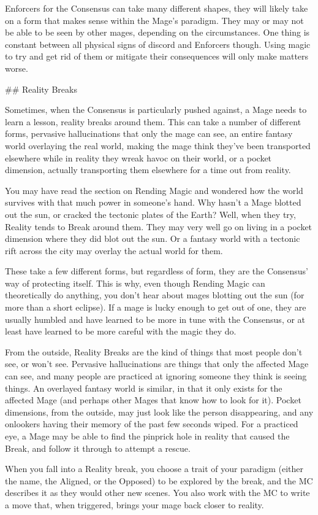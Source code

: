 \documentclass[
  oneside,
  statementpaper,
  9pt]{memoir}
\begin{document}
\begin{Player}
Enforcers for the Consensus can take many different shapes, they will likely take on a form that makes sense within the Mage’s paradigm. They may or may not be able to be seen by other mages, depending on the circumstances. One thing is constant between all physical signs of discord and Enforcers though. Using magic to try and get rid of them or mitigate their consequences will only make matters worse.

## Reality Breaks

Sometimes, when the Consensus is particularly pushed against, a Mage needs to learn a lesson, reality breaks around them. This can take a number of different forms, pervasive hallucinations that only the mage can see, an entire fantasy world overlaying the real world, making the mage think they’ve been transported elsewhere while in reality they wreak havoc on their world, or a pocket dimension, actually transporting them elsewhere for a time out from reality.

You may have read the section on Rending Magic and wondered how the world survives with that much power in someone’s hand. Why hasn’t a Mage blotted out the sun, or cracked the tectonic plates of the Earth? Well, when they try, Reality tends to Break around them. They may very well go on living in a pocket dimension where they did blot out the sun. Or a fantasy world with a tectonic rift across the city may overlay the actual world for them.

These take a few different forms, but regardless of form, they are the Consensus’ way of protecting itself. This is why, even though Rending Magic can theoretically do anything, you don’t hear about mages blotting out the sun (for more than a short eclipse). If a mage is lucky enough to get out of one, they are usually humbled and have learned to be more in tune with the Consensus, or at least have learned to be more careful with the magic they do.

From the outside, Reality Breaks are the kind of things that most people don’t see, or won’t see. Pervasive hallucinations are things that only the affected Mage can see, and many people are practiced at ignoring someone they think is seeing things. An overlayed fantasy world is similar, in that it only exists for the affected Mage (and perhaps other Mages that know how to look for it). Pocket dimensions, from the outside, may just look like the person disappearing, and any onlookers having their memory of the past few seconds wiped. For a practiced eye, a Mage may be able to find the pinprick hole in reality that caused the Break, and follow it through to attempt a rescue.

When you fall into a Reality break, you choose a trait of your paradigm (either the name, the Aligned, or the Opposed) to be explored by the break, and the MC describes it as they would other new scenes. You also work with the MC to write a move that, when triggered, brings your mage back closer to reality.

\end{Player}
\end{document}
